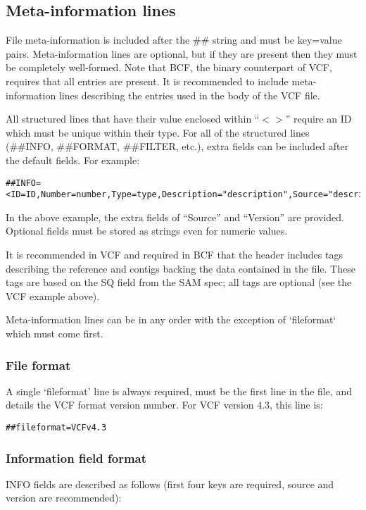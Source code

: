 \documentclass[8pt]{article}
\begin{document}
\subsection{Meta-information lines}
File meta-information is included after the \#\# string and must be key=value pairs.
Meta-information lines are optional, but if they are present then they must be completely well-formed.
Note that BCF, the binary counterpart of VCF, requires that all entries are present.
It is recommended to include meta-information lines describing the entries used in the body of the VCF file.

All structured lines that have their value enclosed within ``$<>$'' require an ID which must be unique within their type.
For all of the structured lines (\#\#INFO, \#\#FORMAT, \#\#FILTER, etc.), extra fields can be included after the default fields.
For example:
\begin{verbatim}
##INFO=<ID=ID,Number=number,Type=type,Description="description",Source="description",Version="128">
\end{verbatim}
In the above example, the extra fields of ``Source'' and ``Version'' are provided.
Optional fields must be stored as strings even for numeric values.

It is recommended in VCF and required in BCF that the header includes tags describing the reference and contigs backing the data contained in the file.
These tags are based on the SQ field from the SAM spec; all tags are optional (see the VCF example above).

Meta-information lines can be in any order with the exception of `fileformat` which must come first.


\subsubsection{File format}
A single `fileformat' line is always required, must be the first line in the file, and details the VCF format version number.
For VCF version 4.3, this line is:

\begin{verbatim}
##fileformat=VCFv4.3
\end{verbatim}


\subsubsection{Information field format}
INFO fields are described as follows (first four keys are required, source and version are recommended):
\end{document}
